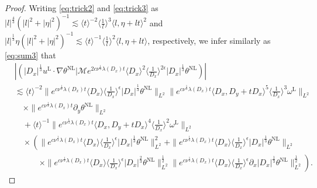 \documentclass[reqno, 12pt]{amsart} %
\theoremstyle{plain} %
\theoremstyle{definition}
\theoremstyle{remark}
\numberwithin{equation}{section} %
\newcommand{\lt}{\left}
\newcommand{\rt}{\right}
\newcommand{\px}{\partial_x}
\newcommand{\py}{\partial_y}
\begin{document}
\begin{proof}
		Writing \eqref{eq:trick2} and \eqref{eq:trick3} as $|l|^\frac43(|l|^2+|\eta|^2)^{-1}   \lesssim\langle t\rangle^{-2}\langle\frac{1}{l}\rangle^3 \langle l, \eta+l t\rangle^2$ and $ |l|^\frac13 \eta  (|l|^2+|\eta|^2)^{-1}   \lesssim\langle t\rangle^{-1}\langle\frac{1}{l}\rangle^2 \langle l, \eta+l t\rangle$, respectively, 
		we infer similarly as \eqref{eq:sum3} that
		\begin{equation*}\begin{aligned} \label{eq:sum4}
				&\left|\left( |D_x|^\frac13  u^{\mathrm{L}} \cdot\nabla \theta^{\mathrm{NL}} \big| \mathcal{M} e^{2 c \nu^{\frac{1}{3}} \lambda\left(D_x\right) t}\langle D_x\rangle^2\langle\frac{1}{D_x}\rangle^{2 \epsilon} |D_x|^\frac13 \theta^{\mathrm{NL}} \right)\right| \\
				&\lesssim \langle t\rangle^{-2} \|e^{c \nu^{\frac{1}{3}} \lambda\left(D_x\right) t}\langle D_x\rangle  \langle \frac{1}{D_x}\rangle^\epsilon |D_x|^\frac13  \theta^{\mathrm{NL}}\|_{L^2}    \|e^{c \nu^{\frac{1}{3}} \lambda\left(D_x\right) t}\langle D_x, D_y + tD_x\rangle^ 5 \langle\frac{1}{D_x}\rangle^3 \omega^{\mathrm{L}} \|_{L^2} \\
				&\quad \times \|e^{c \nu^{\frac{1}{3}} \lambda\left(D_x\right) t} \py  \theta^{\mathrm{NL}} \|_{L^2} \\
				&\quad +  \langle t\rangle^{-1}     \|e^{c \nu^{\frac{1}{3}} \lambda\left(D_x\right) t}\langle D_x, D_y+t D_x\rangle^4\langle\frac{1}{D_x}\rangle^2 \omega^{\mathrm{L}}\|_{L^2} \\
				& \quad \times \left(\|e^{c \nu^{\frac{1}{3}} \lambda\left(D_x\right) t}\langle D_x\rangle\langle\frac{1}{D_x}\rangle^\epsilon |D_x|^\frac13 \theta^{\mathrm{NL}}\|_{L^2} ^2  + \|e^{c \nu^{\frac{1}{3}} \lambda\left(D_x\right) t}\langle D_x\rangle\langle\frac{1}{D_x}\rangle^\epsilon\left|D_x\right|^{\frac{1}{3}} \theta^{\mathrm{NL}}\|_{L^2} \rt.\\
				&\qquad \quad \lt.\times \|e^{c \nu^{\frac{1}{3}} \lambda\left(D_x\right) t}\langle D_x\rangle\langle\frac{1}{D_x}\rangle^\epsilon\left|D_x\right|^{\frac{2}{3}} \theta^{\mathrm{NL}}\|_{L^2}^{\frac{1}{2}}   \|e^{c \nu^{\frac{1}{3}} \lambda\left(D_x\right) t}\langle D_x\rangle\langle\frac{1}{D_x}\rangle^\epsilon \px |D_x|^\frac13  \theta^{\mathrm{NL}}\|_{L^2}^{\frac{1}{2}}\right).
		\end{aligned}\end{equation*}
		

\end{proof}
\end{document}
